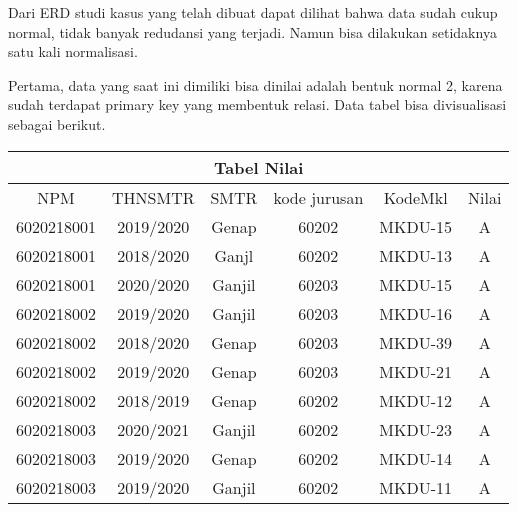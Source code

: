 \documentclass[12pt,a4paper]{article}
\begin{document}
Dari ERD studi kasus yang telah dibuat dapat dilihat bahwa data sudah cukup normal, tidak
banyak redudansi yang terjadi. Namun bisa dilakukan setidaknya satu
kali normalisasi. 

Pertama, data yang saat ini dimiliki bisa dinilai adalah bentuk normal 2, karena
sudah terdapat primary key yang membentuk relasi. Data tabel bisa divisualisasi
sebagai berikut.

\vspace{1cm}

\begin{adjustbox}{scale=0.5,center}
  \begin{tabular}{ |c|c|c|c|c|c| } 
    \hline
    \multicolumn{6}{|c|}{Tabel Nilai} \\ \hline
    NPM        & THNSMTR   & SMTR    & kode jurusan & KodeMkl & Nilai \\ \hline \hline
    6020218001 & 2019/2020 & Genap   & 60202        & MKDU-15 & A     \\ \hline
    6020218001 & 2018/2020 & Ganjl   & 60202        & MKDU-13 & A     \\ \hline
    6020218001 & 2020/2020 & Ganjil  & 60203        & MKDU-15 & A     \\ \hline
    6020218002 & 2019/2020 & Ganjil  & 60203        & MKDU-16 & A     \\ \hline
    6020218002 & 2018/2020 & Genap   & 60203        & MKDU-39 & A     \\ \hline
    6020218002 & 2019/2020 & Genap   & 60203        & MKDU-21 & A     \\ \hline
    6020218002 & 2018/2019 & Genap   & 60202        & MKDU-12 & A     \\ \hline
    6020218003 & 2020/2021 & Ganjil  & 60202        & MKDU-23 & A     \\ \hline
    6020218003 & 2019/2020 & Genap   & 60202        & MKDU-14 & A     \\ \hline
    6020218003 & 2019/2020 & Ganjil  & 60202        & MKDU-11 & A     \\ 
    \hline
  \end{tabular}
\end{adjustbox}
\end{document}
